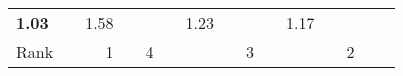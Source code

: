 \begin{tabular}{ll|rrrrrr|rrrrrrr}

  
  \textbf{1.03} &  & 1.58 &  &  &  & 1.23 &  &  &  & 1.17 \\

  Rank & &
  1 &  & 4 &  &  &  & 3 &  &  &  & 2 \\\hline\hline
  

\end{tabular}
